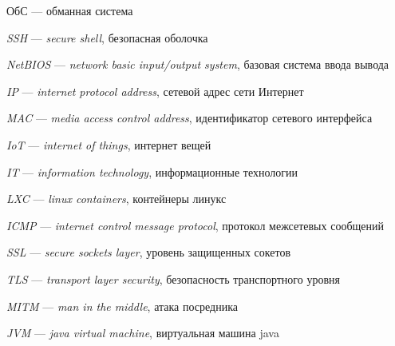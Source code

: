 
ОбС — обманная система

\textit{SSH} — \textit{secure shell}, безопасная оболочка

\textit{NetBIOS} — \textit{network basic input/output system}, базовая система ввода вывода

\textit{IP} — \textit{internet protocol address}, сетевой адрес сети Интернет

\textit{MAC} — \textit{media access control address}, идентификатор сетевого интерфейса

\textit{IoT} — \textit{internet of things}, интернет вещей

\textit{IT} — \textit{information technology}, информационные технологии

\textit{LXC} — \textit{linux containers}, контейнеры линукс

\textit{ICMP} — \textit{internet control message protocol}, протокол межсетевых сообщений

\textit{SSL} — \textit{secure sockets layer}, уровень защищенных сокетов

\textit{TLS} — \textit{transport layer security}, безопасность транспортного уровня

\textit{MITM} — \textit{man in the middle}, атака посредника

\textit{JVM} — \textit{java virtual machine}, виртуальная машина java